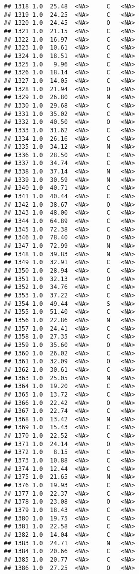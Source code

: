 \documentclass[
]{article}
\begin{document}
\begin{verbatim}
## 1318 1.0  25.48  <NA>     C   <NA>
## 1319 1.0  24.25  <NA>     C   <NA>
## 1320 1.0  24.45  <NA>     O   <NA>
## 1321 1.0  21.15  <NA>     C   <NA>
## 1322 1.0  16.97  <NA>     C   <NA>
## 1323 1.0  10.61  <NA>     C   <NA>
## 1324 1.0  18.51  <NA>     C   <NA>
## 1325 1.0   9.96  <NA>     C   <NA>
## 1326 1.0  18.14  <NA>     C   <NA>
## 1327 1.0  14.05  <NA>     C   <NA>
## 1328 1.0  21.94  <NA>     O   <NA>
## 1329 1.0  26.80  <NA>     N   <NA>
## 1330 1.0  29.68  <NA>     C   <NA>
## 1331 1.0  35.02  <NA>     C   <NA>
## 1332 1.0  40.50  <NA>     O   <NA>
## 1333 1.0  31.62  <NA>     C   <NA>
## 1334 1.0  26.16  <NA>     C   <NA>
## 1335 1.0  34.12  <NA>     N   <NA>
## 1336 1.0  28.50  <NA>     C   <NA>
## 1337 1.0  34.74  <NA>     C   <NA>
## 1338 1.0  37.14  <NA>     N   <NA>
## 1339 1.0  30.59  <NA>     N   <NA>
## 1340 1.0  40.71  <NA>     C   <NA>
## 1341 1.0  40.44  <NA>     C   <NA>
## 1342 1.0  38.67  <NA>     O   <NA>
## 1343 1.0  48.00  <NA>     C   <NA>
## 1344 1.0  64.89  <NA>     C   <NA>
## 1345 1.0  72.38  <NA>     C   <NA>
## 1346 1.0  78.40  <NA>     O   <NA>
## 1347 1.0  72.99  <NA>     N   <NA>
## 1348 1.0  39.83  <NA>     N   <NA>
## 1349 1.0  32.91  <NA>     C   <NA>
## 1350 1.0  28.94  <NA>     C   <NA>
## 1351 1.0  32.13  <NA>     O   <NA>
## 1352 1.0  34.76  <NA>     C   <NA>
## 1353 1.0  37.22  <NA>     C   <NA>
## 1354 1.0  49.44  <NA>     S   <NA>
## 1355 1.0  51.40  <NA>     C   <NA>
## 1356 1.0  22.86  <NA>     N   <NA>
## 1357 1.0  24.41  <NA>     C   <NA>
## 1358 1.0  27.35  <NA>     C   <NA>
## 1359 1.0  35.60  <NA>     O   <NA>
## 1360 1.0  26.02  <NA>     C   <NA>
## 1361 1.0  32.09  <NA>     O   <NA>
## 1362 1.0  30.61  <NA>     C   <NA>
## 1363 1.0  25.05  <NA>     N   <NA>
## 1364 1.0  19.20  <NA>     C   <NA>
## 1365 1.0  13.72  <NA>     C   <NA>
## 1366 1.0  22.42  <NA>     O   <NA>
## 1367 1.0  22.74  <NA>     C   <NA>
## 1368 1.0  13.42  <NA>     N   <NA>
## 1369 1.0  15.43  <NA>     C   <NA>
## 1370 1.0  22.52  <NA>     C   <NA>
## 1371 1.0  24.14  <NA>     O   <NA>
## 1372 1.0   8.15  <NA>     C   <NA>
## 1373 1.0  10.88  <NA>     C   <NA>
## 1374 1.0  12.44  <NA>     C   <NA>
## 1375 1.0  21.65  <NA>     N   <NA>
## 1376 1.0  19.93  <NA>     C   <NA>
## 1377 1.0  22.37  <NA>     C   <NA>
## 1378 1.0  23.08  <NA>     O   <NA>
## 1379 1.0  18.43  <NA>     C   <NA>
## 1380 1.0  19.75  <NA>     C   <NA>
## 1381 1.0  22.58  <NA>     C   <NA>
## 1382 1.0  14.04  <NA>     C   <NA>
## 1383 1.0  24.71  <NA>     N   <NA>
## 1384 1.0  20.66  <NA>     C   <NA>
## 1385 1.0  20.77  <NA>     C   <NA>
## 1386 1.0  27.25  <NA>     O   <NA>

\end{verbatim}
\end{document}
